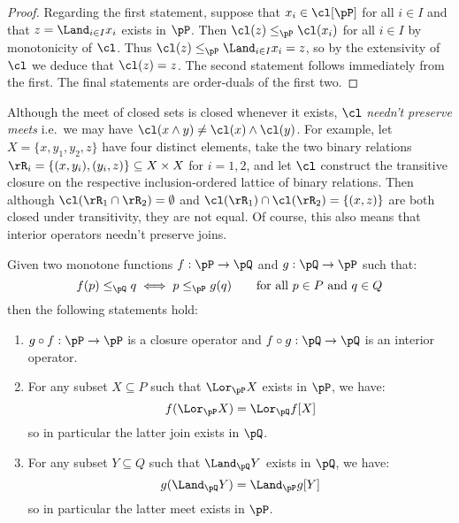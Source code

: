 \documentclass{article}
\begin{document}
\begin{proof}
Regarding the first statement, suppose that $x_i \in \cl[\pP]$ for all $i \in I$ and that $z = \Land_{i \in I} x_i$ exists in $\pP$. Then $\cl(z) \leq_\pP \cl(x_i)$ for all $i \in I$ by monotonicity of $\cl$. Thus $\cl(z) \leq_\pP \Land_{i\in I} x_i = z$, so by the extensivity of $\cl$ we deduce that $\cl(z) = z$. The second statement follows immediately from the first. The final statements are order-duals of the first two.
\end{proof}

\begin{note}
\item
Although the meet of closed sets is closed whenever it exists, $\cl$  \emph{needn't preserve meets} i.e.\ we may have $\cl(x \land y) \neq \cl(x) \land \cl(y)$. For example, let $X = \{x,y_1,y_2,z\}$ have four distinct elements, take the two binary relations $\rR_i = \{(x,y_i),(y_i,z)\} \subseteq X \times X$ for $i = 1,2$, and let $\cl$ construct the transitive closure on the respective inclusion-ordered lattice of binary relations. Then although $\cl(\rR_1 \cap \rR_2) = \emptyset$ and $\cl(\rR_1) \cap \cl(\rR_2) = \{(x,z)\}$ are both closed under transitivity, they are not equal. Of course, this also means that interior operators needn't preserve joins. \endbox
\end{note}

\begin{lemma}
\label{lem:adjoint_cl_in}
\item
Given two monotone functions $f : \pP \to \pQ$ and $g : \pQ \to \pP$ such that:
\[
f(p) \leq_\pQ q
\iff
p \leq_\pP g(q)
\qquad
\text{for all $p \in P$ and $q \in Q$}
\]
then the following statements hold:
\begin{enumerate}
\item
$g \circ f : \pP \to \pP$ is a closure operator and $f \circ g : \pQ \to \pQ$ is an interior operator.

\item
For any subset $X \subseteq P$ such that $\Lor_\pP X$ exists in $\pP$, we have:
\[
f(\Lor_\pP X) = \Lor_\pQ f[X]
\]
so in particular the latter join exists in $\pQ$.

\item
For any subset $Y \subseteq Q$ such that $\Land_\pQ Y$ exists in $\pQ$, we have:
\[
g(\Land_\pQ Y) = \Land_\pP g[Y]
\]
so in particular the latter meet exists in $\pP$.


\end{enumerate}
\end{lemma}
\end{document}
